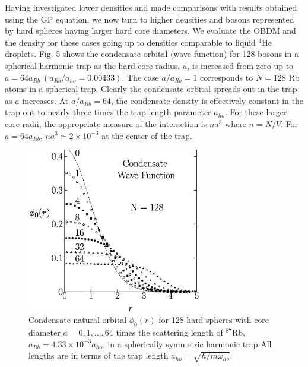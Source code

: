 \documentclass[aps,pra,twocolumn,groupedaddress]{revtex4}
\begin{document}
Having investigated lower densities and made comparisons with results obtained
using the GP equation, we now turn to higher densities and bosons represented by
hard spheres having larger hard core diameters. We evaluate the OBDM and the
density for these cases going up to densities comparable to liquid $^4$He
droplets. Fig. 5 shows the condensate orbital (wave function) for 128 bosons in
a spherical harmonic trap as the hard core radius, $a$, is increased from zero
up to $a = 64 a_{Rb}\ (a_{Rb}/a_{ho} = 0.00433)$. The case $a/a_{Rb} = 1$
corresponds to $N = 128$ Rb atoms in a spherical trap. Clearly the condensate
orbital spreads out in the trap as $a$ increases. At $a/a_{Rb} = 64$, the
condensate density is effectively constant in the trap out to nearly three times
the trap length parameter $a_{ho}$. For these larger core radii, the appropriate
measure of the interaction is $na^3$ where $n = N/V$. For $a = 64 a_{Rb}$, $na^3
\simeq 2 \times 10^{-3}$ at the center of the trap.
    \begin{figure}
\begin{center}
\includegraphics[width=3in]{fig5.ps}
\caption{\footnotesize
Condensate natural orbital $\phi_0(r)$ for 128 hard spheres with core diameter 
$a = 0,1,...,64$ times the scattering length of
$^{87}$Rb, $a_{Rb} = 4.33 \times 10^{-3}a_{ho}$. 
in a spherically symmetric harmonic trap 
All lengths are in 
terms of the trap length $a_{ho} = \sqrt{{\hbar}/{m \omega_{ho}}}$.
        }
\end{center}
    \end{figure}
\end{document}
